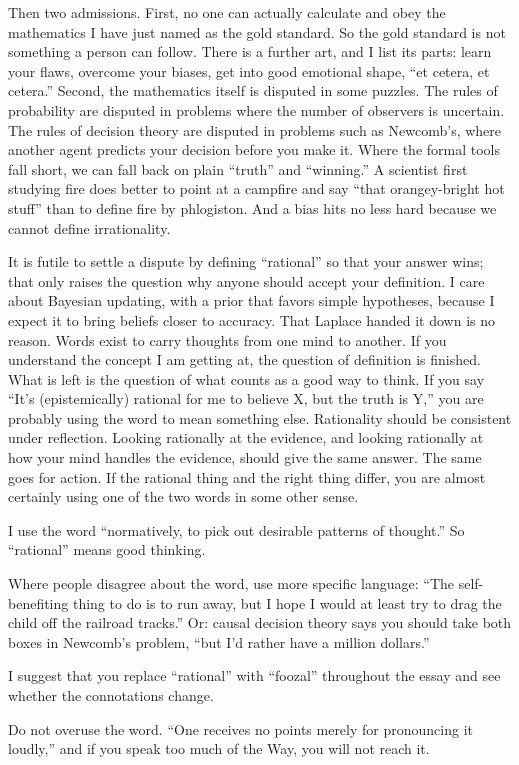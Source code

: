 Then two admissions. First, no one can actually calculate and obey the mathematics I have just named as the gold standard. So the gold standard is not something a person can follow. There is a further art, and I list its parts: learn your flaws, overcome your biases, get into good emotional shape, ``et cetera, et cetera.'' Second, the mathematics itself is disputed in some puzzles. The rules of probability are disputed in problems where the number of observers is uncertain. The rules of decision theory are disputed in problems such as Newcomb's, where another agent predicts your decision before you make it. Where the formal tools fall short, we can fall back on plain ``truth'' and ``winning.'' A scientist first studying fire does better to point at a campfire and say ``that orangey-bright hot stuff'' than to define fire by phlogiston. And a bias hits no less hard because we cannot define irrationality.

It is futile to settle a dispute by defining ``rational'' so that your answer wins; that only raises the question why anyone should accept your definition. I care about Bayesian updating, with a prior that favors simple hypotheses, because I expect it to bring beliefs closer to accuracy. That Laplace handed it down is no reason. Words exist to carry thoughts from one mind to another. If you understand the concept I am getting at, the question of definition is finished. What is left is the question of what counts as a good way to think. If you say ``It's (epistemically) rational for me to believe X, but the truth is Y,'' you are probably using the word to mean something else. Rationality should be consistent under reflection. Looking rationally at the evidence, and looking rationally at how your mind handles the evidence, should give the same answer. The same goes for action. If the rational thing and the right thing differ, you are almost certainly using one of the two words in some other sense.

I use the word ``normatively, to pick out desirable patterns of thought.'' So ``rational'' means good thinking.

Where people disagree about the word, use more specific language: ``The self-benefiting thing to do is to run away, but I hope I would at least try to drag the child off the railroad tracks.'' Or: causal decision theory says you should take both boxes in Newcomb's problem, ``but I'd rather have a million dollars.'' 

I suggest that you replace ``rational'' with ``foozal'' throughout the essay and see whether the connotations change.

Do not overuse the word. ``One receives no points merely for pronouncing it loudly,'' and if you speak too much of the Way, you will not reach it.
